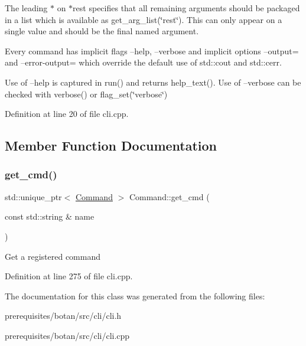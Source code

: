 The leading \textquotesingle{}$\ast$\textquotesingle{} on \textquotesingle{}$\ast$rest\textquotesingle{} specifies that all remaining arguments should be packaged in a list which is available as get\+\_\+arg\+\_\+list(\char`\"{}rest\char`\"{}). This can only appear on a single value and should be the final named argument.

Every command has implicit flags --help, --verbose and implicit options --output= and --error-\/output= which override the default use of std\+::cout and std\+::cerr.

Use of --help is captured in run() and returns help\+\_\+text(). Use of --verbose can be checked with verbose() or flag\+\_\+set(\char`\"{}verbose\char`\"{}) 

Definition at line 20 of file cli.\+cpp.



\subsection{Member Function Documentation}
\mbox{\label{class_botan___c_l_i_1_1_command_a2bf2603ec9998286f53f751c1d6ab9e1}} 
\subsubsection{\texorpdfstring{get\+\_\+cmd()}{get\_cmd()}}
{\footnotesize\ttfamily std\+::unique\+\_\+ptr$<$ \mbox{\hyperlink{class_botan___c_l_i_1_1_command}{Command}} $>$ Command\+::get\+\_\+cmd (\begin{DoxyParamCaption}\item[{const std\+::string \&}]{name }\end{DoxyParamCaption})\hspace{0.3cm}{\ttfamily [static]}}

Get a registered command 

Definition at line 275 of file cli.\+cpp.



The documentation for this class was generated from the following files\+:\begin{DoxyCompactItemize}
\item 
prerequisites/botan/src/cli/cli.\+h\item 
prerequisites/botan/src/cli/cli.\+cpp\end{DoxyCompactItemize}
